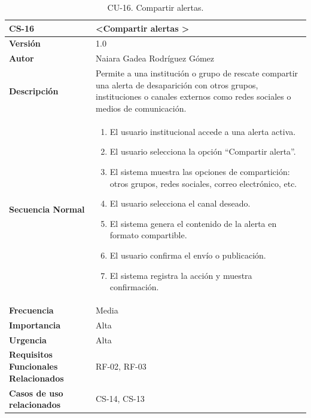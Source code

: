 \begin{table}[htbp] %
\centering
\begin{tabular}{ |m{3cm}|m{11cm}|  } 
\hline
\cellcolor[HTML]{B9E3F0}\centering\textbf{CS-16} & \cellcolor[HTML]{B9E3F0}\textbf{\textless Compartir alertas \textgreater}\\

\hline
\cellcolor[HTML]{EFEFEF}\textbf{Versión}             & 1.0  \\
\hline
\cellcolor[HTML]{EFEFEF}\textbf{Autor}                & Naiara Gadea Rodríguez Gómez\\
\hline
\cellcolor[HTML]{EFEFEF}\textbf{Descripción}                & {Permite a una institución o grupo de rescate compartir una alerta de desaparición con otros grupos, instituciones o canales externos como redes sociales o medios de comunicación.}\\
\hline
\cellcolor[HTML]{EFEFEF}\textbf{Secuencia \newline Normal}                &                 
        \begin{enumerate}
			\item El usuario institucional accede a una alerta activa.
			\item El usuario selecciona la opción “Compartir alerta”.
			\item El sistema muestra las opciones de compartición: otros grupos, redes sociales, correo electrónico, etc.
			\item El usuario selecciona el canal deseado.
			\item El sistema genera el contenido de la alerta en formato compartible.
			\item El usuario confirma el envío o publicación.
			\item El sistema registra la acción y muestra confirmación.
		\end{enumerate}\\
\hline
\cellcolor[HTML]{EFEFEF}\textbf{Frecuencia}                & Media\\
\hline
\cellcolor[HTML]{EFEFEF}\textbf{Importancia}                & Alta\\
\hline
\cellcolor[HTML]{EFEFEF}\textbf{Urgencia}                & Alta\\
\hline
\cellcolor[HTML]{EFEFEF}\textbf{Requisitos Funcionales Relacionados}                & {RF-02, RF-03}\\
\hline
\cellcolor[HTML]{EFEFEF}\textbf{Casos de uso relacionados}                & {CS-14, CS-13}\\
\hline
\end{tabular}
\caption{CU-16. Compartir alertas.}
\end{table}

